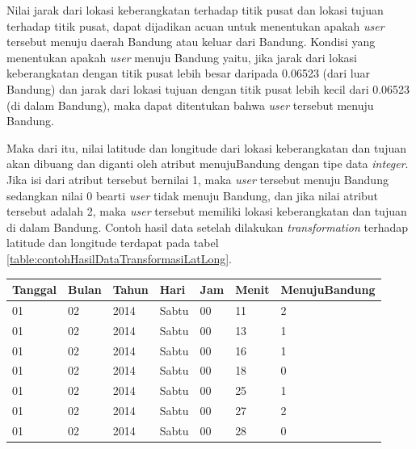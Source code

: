 Nilai jarak dari lokasi keberangkatan terhadap titik pusat dan lokasi tujuan terhadap titik pusat, dapat dijadikan acuan untuk menentukan apakah \textsl{user} tersebut menuju daerah Bandung atau keluar dari Bandung. Kondisi yang menentukan apakah \textsl{user} menuju Bandung yaitu, jika jarak dari lokasi keberangkatan dengan titik pusat lebih besar daripada 0.06523 (dari luar Bandung) dan jarak dari lokasi tujuan dengan titik pusat lebih kecil dari 0.06523 (di dalam Bandung), maka dapat ditentukan bahwa \textsl{user} tersebut menuju Bandung.

Maka dari itu, nilai latitude dan longitude dari lokasi keberangkatan dan tujuan akan dibuang dan diganti oleh atribut menujuBandung dengan tipe data \textsl{integer}. Jika isi dari atribut tersebut bernilai 1, maka \textsl{user} tersebut menuju Bandung sedangkan nilai 0 bearti \textsl{user} tidak menuju Bandung, dan jika nilai atribut tersebut adalah 2, maka \textsl{user} tersebut memiliki lokasi keberangkatan dan tujuan di dalam Bandung. Contoh hasil data setelah dilakukan \textsl{transformation} terhadap latitude dan longitude terdapat pada tabel \ref{table:contohHasilDataTransformasiLatLong}.

\begin{table}[h]
\caption{Contoh hasil data transformasi latitude longitude}
\label{table:contohHasilDataTransformasiLatLong}
\begin{longtable}{|l|l|l|l|l|l|l|}
\hline
\textbf{Tanggal}	& \textbf{Bulan}	& \textbf{Tahun} 	& \textbf{Hari} & \textbf{Jam}	& \textbf{Menit} & \textbf{MenujuBandung} \\ \hline
01				         	& 02								& 2014						& Sabtu         & 00         	& 11						 & 2                    \\ \hline
01				         	& 02								& 2014						& Sabtu         & 00         	& 13						 & 1        					  \\ \hline
01				          & 02								& 2014						& Sabtu         & 00         	& 16						 & 1       							\\ \hline
01				          & 02								& 2014						& Sabtu         & 00         	& 18						 & 0         						\\ \hline
01				          & 02								& 2014						& Sabtu         & 00         	& 25						 & 1          					\\ \hline
01				          & 02								& 2014						& Sabtu         & 00         	& 27						 & 2      							\\ \hline
01				          & 02								& 2014						& Sabtu         & 00         	& 28						 & 0       							\\ \hline
\end{longtable}
\end{table} 


